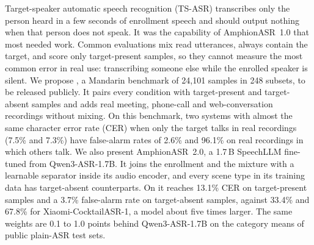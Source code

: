 
Target-speaker automatic speech recognition (TS-ASR) transcribes only the person heard in a few seconds of enrollment speech and should output nothing when that person does not speak.
It was the capability of AmphionASR~1.0 that most needed work.
Common evaluations mix read utterances, always contain the target, and score only target-present samples, so they cannot measure the most common error in real use: transcribing someone else while the enrolled speaker is silent.
We propose \tsbench, a Mandarin benchmark of 24{,}101 samples in 248 subsets, to be released publicly.
It pairs every condition with target-present and target-absent samples and adds real meeting, phone-call and web-conversation recordings without mixing.
On this benchmark, two systems with almost the same character error rate (CER) when only the target talks in real recordings (7.5\% and 7.3\%) have false-alarm rates of 2.6\% and 96.1\% on real recordings in which others talk.
We also present AmphionASR~2.0, a 1.7\,B SpeechLLM fine-tuned from Qwen3-ASR-1.7B.
It joins the enrollment and the mixture with a learnable separator inside its audio encoder, and every scene type in its training data has target-absent counterparts.
On \tsbench it reaches 13.1\% CER on target-present samples and a 3.7\% false-alarm rate on target-absent samples, against 33.4\% and 67.8\% for Xiaomi-CocktailASR-1, a model about five times larger.
The same weights are 0.1 to 1.0 points behind Qwen3-ASR-1.7B on the category means of public plain-ASR test sets.
